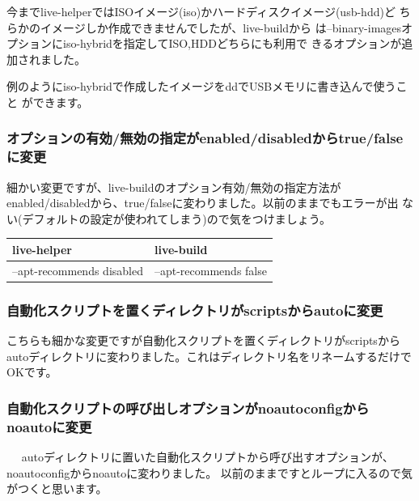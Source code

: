 \documentclass[mingoth,a4paper]{jsarticle}
\begin{document}
今までlive-helperではISOイメージ(iso)かハードディスクイメージ(usb-hdd)ど
ちらかのイメージしか作成できませんでしたが、live-buildから
は--binary-imagesオプションにiso-hybridを指定してISO,HDDどちらにも利用で
きるオプションが追加されました。

例のようにiso-hybridで作成したイメージをddでUSBメモリに書き込んで使うこと
ができます。


\subsubsection{オプションの有効/無効の指定がenabled/disabledからtrue/falseに変更}

細かい変更ですが、live-buildのオプション有効/無効の指定方法が
enabled/disabledから、true/falseに変わりました。以前のままでもエラーが出
ない(デフォルトの設定が使われてしまう)ので気をつけましょう。

\begin{table}[h]
\begin{center}
 \begin{tabular}{|l|l|}
 \hline
 live-helper & live-build \\
 \hline \hline
 --apt-recommends disabled & --apt-recommends false  \\
 \hline
 \end{tabular}
\end{center}
\end{table}

\subsubsection{自動化スクリプトを置くディレクトリがscriptsからautoに変更}

こちらも細かな変更ですが自動化スクリプトを置くディレクトリがscriptsから
autoディレクトリに変わりました。これはディレクトリ名をリネームするだけで
OKです。

\subsubsection{自動化スクリプトの呼び出しオプションがnoautoconfigからnoautoに変更}
　
autoディレクトリに置いた自動化スクリプトから呼び出すオプションが、
noautoconfigからnoautoに変わりました。
以前のままですとループに入るので気がつくと思います。
\end{document}
